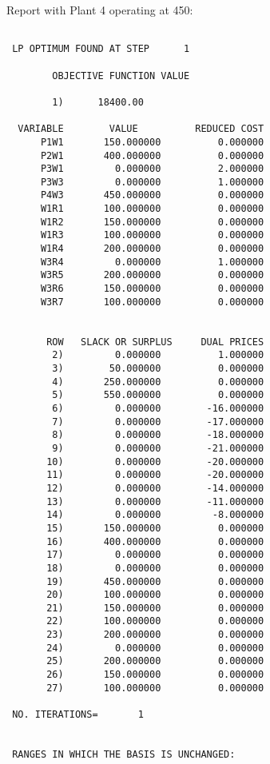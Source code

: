 Report with Plant 4 operating at 450:\\
\begin{verbatim}

 LP OPTIMUM FOUND AT STEP      1

        OBJECTIVE FUNCTION VALUE

        1)      18400.00

  VARIABLE        VALUE          REDUCED COST
      P1W1       150.000000          0.000000
      P2W1       400.000000          0.000000
      P3W1         0.000000          2.000000
      P3W3         0.000000          1.000000
      P4W3       450.000000          0.000000
      W1R1       100.000000          0.000000
      W1R2       150.000000          0.000000
      W1R3       100.000000          0.000000
      W1R4       200.000000          0.000000
      W3R4         0.000000          1.000000
      W3R5       200.000000          0.000000
      W3R6       150.000000          0.000000
      W3R7       100.000000          0.000000


       ROW   SLACK OR SURPLUS     DUAL PRICES
        2)         0.000000          1.000000
        3)        50.000000          0.000000
        4)       250.000000          0.000000
        5)       550.000000          0.000000
        6)         0.000000        -16.000000
        7)         0.000000        -17.000000
        8)         0.000000        -18.000000
        9)         0.000000        -21.000000
       10)         0.000000        -20.000000
       11)         0.000000        -20.000000
       12)         0.000000        -14.000000
       13)         0.000000        -11.000000
       14)         0.000000         -8.000000
       15)       150.000000          0.000000
       16)       400.000000          0.000000
       17)         0.000000          0.000000
       18)         0.000000          0.000000
       19)       450.000000          0.000000
       20)       100.000000          0.000000
       21)       150.000000          0.000000
       22)       100.000000          0.000000
       23)       200.000000          0.000000
       24)         0.000000          0.000000
       25)       200.000000          0.000000
       26)       150.000000          0.000000
       27)       100.000000          0.000000

 NO. ITERATIONS=       1


 RANGES IN WHICH THE BASIS IS UNCHANGED:


\end{verbatim}
